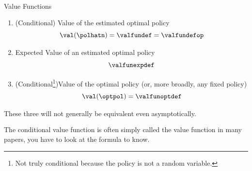 \documentclass[aspectratio=169, professionalfonts, handout]{beamer}
\begin{document}
\begin{frame}{Value Functions}
	\begin{enumerate}
		\item (Conditional) Value of the estimated optimal policy
		      $$\val(\polhatn) = \valfundef = \valfundefop$$
		      \vfill \pause
		\item Expected Value of an estimated optimal policy
		      $$\valfunexpdef$$
		      \vfill \pause
		\item (Conditional\footnote{\tiny Not truly conditional because the
			      policy is not a random variable.})Value of the optimal policy (or, more broadly, any fixed policy)
		      $$\val(\optpol) = \valfunoptdef$$
	\end{enumerate}
	\pause
	These three will not generally be equivalent even asymptotically.

	\tiny The
	conditional value function is often simply called the value function in
	many papers, you have to look at the formula to know.
\end{frame}

\end{document}
